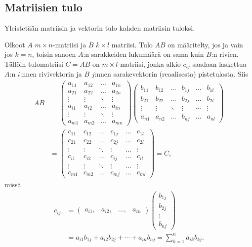 \documentclass[a4paper, 12pt]{article}
\theoremstyle{remark}
\theoremstyle{definition}
\begin{document}
\subsection{Matriisien tulo}

Yleistetään matriisin ja vektorin tulo kahden matriisin tuloksi. 

\begin{maar} Olkoot $A$ $m\times n$-matriisi ja $B$ $k\times l$ matriisi. Tulo $AB$ on määritelty, jos ja vain jos $k=n$, toisin sanoen $A$:n sarakkeiden lukumäärä on sama kuin $B$:n rivien. Tällöin tulomatriisi $C=AB$ on $m\times l$-matriisi, jonka alkio $c_{ij}$ saadaan laskettua $A$:n 
$i$:nnen rivivektorin ja $B$ $j$:nnen sarakevektorin (reaalisesta) pistetulosta. Siis
\begin{align*}
AB&=\begin{pmatrix} 
   a_{11} &  a_{12}  & \ldots & a_{1n}\\
a_{21}  &  a_{22} & \ldots & a_{2n}\\
\vdots & \vdots & \ddots & \vdots\\
a_{i1} & a_{i2} & \ldots & a_{in}\\
\vdots & \vdots & \ddots & \vdots\\
a_{m1}  &   a_{m2}       &\ldots & a_{mn}     
    \end{pmatrix}
    \begin{pmatrix} 
   b_{11} &  b_{12}  & \ldots & b_{1j}& \ldots & b_{1l}\\
b_{21}  &  b_{22} & \ldots & b_{2j} & \ldots & b_{2l}\\
\vdots & \vdots & \ddots & \vdots&\cdots&\vdots\\
a_{n1}  &   a_{n2}       &\ldots& b_{nj}& \ldots& a_{nl}     
    \end{pmatrix}
    \\
    &=
    \begin{pmatrix} 
   c_{11} &  c_{12}  & \ldots & c_{1j}&\ldots & c_{1l}\\
c_{21}  &  c_{22} & \ldots & c_{2j}&\ldots &c_{2l}\\
\vdots & \vdots & \ddots & \vdots&\ldots&\vdots\\
c_{i1} & c_{i2} & \ldots & c_{ij}&\ldots & c_{il}\\
\vdots & \vdots & \ddots &\vdots &\ldots& \vdots\\
c_{m1}  &   c_{m2}       &\ldots &c_{mj}&\ldots& c_{ml}     
    \end{pmatrix}=C,
\end{align*}
missä
\begin{align*}
c_{ij}&=\begin{pmatrix}
a_{i1}, & a_{i2}, & \ldots,& a_{in}
\end{pmatrix}
\begin{pmatrix}
b_{1j}\\
b_{2j}\\
\vdots\\
b_{nj}
\end{pmatrix}\\
&=a_{i1}b_{1j}+a_{i2}b_{2j}+\cdots+a_{in}b_{nj}=\sum_{k=1}^n a_{ik}b_{kj}.
\end{align*}


\end{maar}
\end{document}
